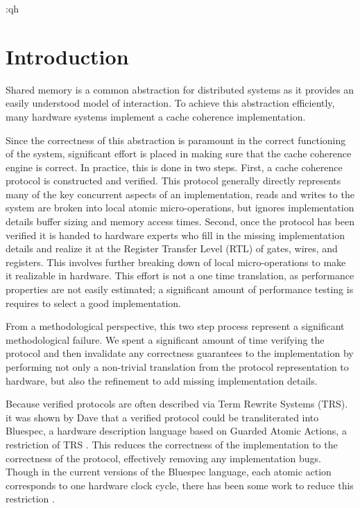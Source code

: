 :qh\section{Introduction}
\label{sec:Introduction}

Shared memory is a common abstraction for distributed systems as it
provides an easily understood model of interaction. To achieve this
abstraction efficiently, many hardware systems implement a cache
coherence implementation. 

Since the correctness of this abstraction is paramount in the correct
functioning of the system, significant effort is placed in making sure
that the cache coherence engine is correct. In practice, this is done
in two steps. First, a cache coherence protocol is constructed and
verified. This protocol generally directly represents many of
the key concurrent aspects of an implementation, \eg reads and
writes to the system are broken into local atomic micro-operations, but
ignores implementation details \eg buffer sizing and memory access
times. Second, once the protocol has been verified it is handed to
hardware experts who fill in the missing implementation details and
realize it at the Register Transfer Level (RTL) of gates, wires, and
registers. This involves further breaking down of local micro-operations to
make it realizable in hardware. This effort is not a one time translation, as
performance properties are not easily estimated; a significant amount of
performance testing is requires to select a good implementation. 

From a methodological perspective, this two step process represent a
significant methodological failure. We spent a significant amount of
time verifying the protocol and then invalidate any correctness
guarantees to the implementation by performing not only a non-trivial
translation from the protocol representation to hardware, but also
the refinement to add missing implementation details.

Because verified protocols are often described via Term Rewrite Systems (TRS).
it was shown by Dave \etal{} that a verified protocol could be transliterated
into Bluespec, a hardware description language based on Guarded Atomic Actions,
a restriction of TRS \cite{Hoe:TCAD, DNA:CoherenceImplementation}. This reduces
the correctness of the implementation to the correctness of the protocol,
effectively removing any implementation bugs. Though in the current versions of
the Bluespec language, each atomic action corresponds to one hardware clock
cycle, there has been some work to reduce this restriction \cite{Karczmarek}.


